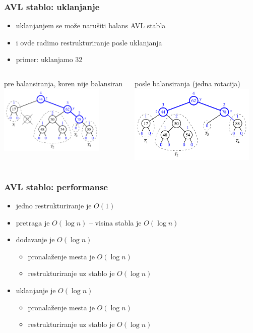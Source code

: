 \documentclass[compress,aspectratio=169]{beamer}
\begin{document}
\begin{frame}[fragile]
  \frametitle{AVL stablo: uklanjanje}
  \begin{itemize}
    \item uklanjanjem se može narušiti balans AVL stabla
    \item i ovde radimo restrukturiranje posle uklanjanja
    \item primer: uklanjamo 32
  \end{itemize}
  \begin{columns}
    \begin{column}[t]{6cm}
      \begin{center}
        pre balansiranja, koren nije balansiran 
        \includegraphics[width=5cm]{asp-11-pic17a.pdf}
      \end{center}
    \end{column}  
    \begin{column}[t]{6cm}
      \begin{center}
        posle balansiranja (jedna rotacija)
        \includegraphics[width=6cm]{asp-11-pic17b.pdf}
      \end{center}
    \end{column}  
  \end{columns}
\end{frame}

\begin{frame}[fragile]
  \frametitle{AVL stablo: performanse}
  \begin{itemize}
    \item jedno restrukturiranje je $O(1)$ 
    \item pretraga je $O(\log n)$ -- visina stabla je $O(\log n)$
    \item dodavanje je $O(\log n)$
    \begin{itemize}
      \item pronalaženje mesta je $O(\log n)$
      \item restrukturiranje uz stablo je $O(\log n)$
    \end{itemize}
    \item uklanjanje je $O(\log n)$
    \begin{itemize}
      \item pronalaženje mesta je $O(\log n)$
      \item restrukturiranje uz stablo je $O(\log n)$
    \end{itemize}
  \end{itemize}
\end{frame}
\end{document}
